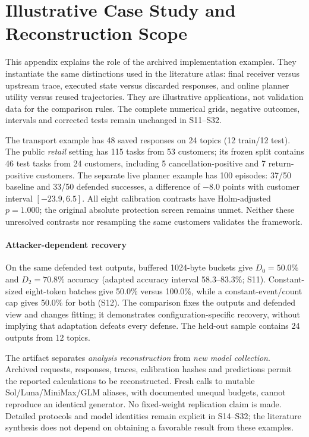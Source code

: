 \section{Illustrative Case Study and Reconstruction Scope}\label{app:case-study}\label{app:equivalence}
This appendix explains the role of the archived implementation examples. They instantiate the same distinctions used in the literature atlas: final receiver versus upstream trace, executed state versus discarded responses, and online planner utility versus reused trajectories. They are illustrative applications, not validation data for the comparison rules. The complete numerical grids, negative outcomes, intervals and corrected tests remain unchanged in S11--S32.

The transport example has 48 saved responses on 24 topics (12 train/12 test). The public \emph{retail} setting has 115 tasks from 53 customers; its frozen split contains 46 test tasks from 24 customers, including 5 cancellation-positive and 7 return-positive customers. The separate live planner example has 100 episodes: 37/50 baseline and 33/50 defended successes, a difference of $-8.0$ points with customer interval $[-23.9,6.5]$. All eight calibration contrasts have Holm-adjusted $p=1.000$; the original absolute protection screen remains unmet. Neither these unresolved contrasts nor resampling the same customers validates the framework.

\paragraph{Attacker-dependent recovery} On the same defended test outputs, buffered 1024-byte buckets give $D_0=50.0\%$ and $D_2=70.8\%$ accuracy (adapted accuracy interval 58.3--83.3\%; S11). Constant-sized eight-token batches give 50.0\% versus 100.0\%, while a constant-event/count cap gives 50.0\% for both (S12). The comparison fixes the outputs and defended view and changes fitting; it demonstrates configuration-specific recovery, without implying that adaptation defeats every defense. The held-out sample contains 24 outputs from 12 topics.

The artifact separates \emph{analysis reconstruction} from \emph{new model collection}. Archived requests, responses, traces, calibration hashes and predictions permit the reported calculations to be reconstructed. Fresh calls to mutable Sol/Luna/MiniMax/GLM aliases, with documented unequal budgets, cannot reproduce an identical generator. No fixed-weight replication claim is made. Detailed protocols and model identities remain explicit in S14--S32; the literature synthesis does not depend on obtaining a favorable result from these examples.
